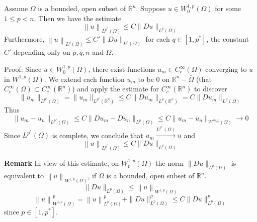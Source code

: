 \begin{theorem}
    Assume $\Omega$ is a bounded, open subset of $\mathbb{R} ^n$.
    Suppose $u \in W_0^{1, p}\left(\Omega\right)$ for some $1 \leq p<n$. Then we have the estimate
    \begin{equation*}
        \left\|u\right\|_{L^{p^*}\left(\Omega\right)} \leq C\|D u\|_{L^p\left(\Omega\right)}
    \end{equation*}
    Furthermore, $\left\|u\right\|_{L^{q}\left(\Omega\right)} \leq C'\|D u\|_{L^p\left(\Omega\right)}$ for each $q \in\left[1, p^*\right]$, the constant $C'$ depending only on $p, q, n$ and $\Omega$.

    Proof:
    Since $u \in W_0^{1, p}\left(\Omega\right)$, there exist functions $u_m \in C_c^{\infty}\left(\Omega\right)$ converging to $u$ in $W^{1, p}\left(\Omega\right)$. We extend each function $u_m$ to be 0 on $\mathbb{R}^n-\bar{\Omega}$ (that $C_c^{\infty}\left(\Omega\right)\subset C_c^{\infty}(\mathbb{R}^n)$) and apply the estimate for $C_c^\infty(\mathbb{R}^n)$ to discover
    $$
        \|u_m\|_{L^{p^*} \left(\Omega\right)}
        =
        \|u_m\|_{L^{p^*} (\mathbb{R}^n)}
        \leq
        C\|D u_m\|_{L^p(\mathbb{R}^n)}
        =
        C\|D u_m\|_{L^p\left(\Omega\right)}
    $$
    Thus
    \[
        \|u_m-u_n\|_{L^{p^*} \left(\Omega\right)}
        \leq
        C\|D u_m- Du_n\|_{L^p\left(\Omega\right)}
        \leq
        C\|u_m-u_n\|_{W^{m,p}\left(\Omega\right)}
        \to
        0
    \]
    Since $L^{p^*}\left(\Omega\right)$ is complete, we conclude that $u_m \xrightarrow{L^{p^*}\left(\Omega\right)} u$ and
    \[\left\|u\right\|_{L^{p^*} \left(\Omega\right)} \leq C\|D u\|_{L^p\left(\Omega\right)}\]

    \textbf{Remark} In view of this estimate, on $W_0^{1, p}\left(\Omega\right)$ the norm $\|D u\|_{L^p\left(\Omega\right)}$ is equivalent to $\left\|u\right\|_{W^{1, p}\left(\Omega\right)}$, if $\Omega$ is a bounded, open subset of $\mathbb{R} ^n$.
    \begin{equation*}
        \|D u\|_{L^p\left(\Omega\right)} \leq \left\|u\right\|_{W^{1, p}\left(\Omega\right)}
    \end{equation*}
    \begin{equation*}
        \left\|u\right\|_{W^{1, p}\left(\Omega\right)}^p
        =
        \left\|u\right\|_{L^p\left(\Omega\right)}^p
        +
        \|D u\|_{L^p\left(\Omega\right)}^p
        \leq
        C\|D u\|_{L^p\left(\Omega\right)}^p
    \end{equation*}
    since $p\in [1, p^*]$.

\end{theorem}


